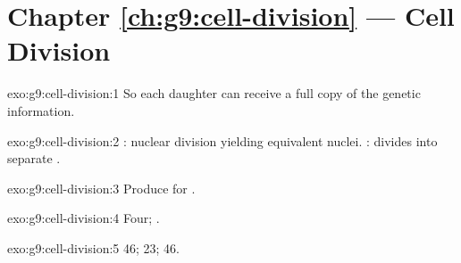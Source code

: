 \section*{Chapter \ref{ch:g9:cell-division} --- Cell Division}

\begin{solution}{exo:g9:cell-division:1}
So each daughter  can receive a full copy of the genetic information.
\end{solution}

\begin{solution}{exo:g9:cell-division:2}
: nuclear division yielding equivalent nuclei. :
 divides into separate .
\end{solution}

\begin{solution}{exo:g9:cell-division:3}
Produce   for .
\end{solution}

\begin{solution}{exo:g9:cell-division:4}
Four; .
\end{solution}

\begin{solution}{exo:g9:cell-division:5}
46; 23; 46.
\end{solution}

